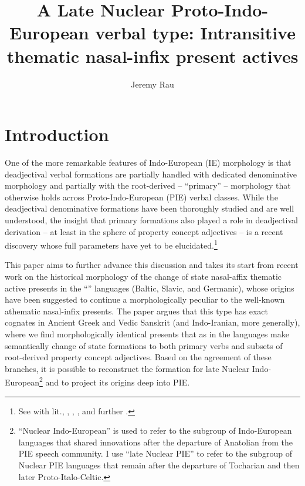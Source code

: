 \documentclass[output=paper,colorlinks,citecolor=brown]{langscibook}
\author{Jeremy Rau\orcid{}\affiliation{Harvard University}}
\title{A Late Nuclear Proto-Indo-European verbal type: Intransitive thematic nasal-infix present actives}
\begin{document}
\maketitle

\section{Introduction} 

 


One of the more remarkable features of Indo-European (IE) morphology is that deadjectival verbal formations are partially handled with dedicated denominative morphology and partially with the root-derived -- ``primary'' -- morphology that otherwise holds across Proto-Indo-European (PIE) verbal classes. While the deadjectival denominative formations have been thoroughly studied and are well understood, the insight that primary formations also played a role in deadjectival derivation  -- at least in the sphere of property concept adjectives -- is a recent discovery whose full parameters have yet to be elucidated.\footnote{See \citealt{Rau2009} with lit., \citeyear{Rau2013}, \citeyear{Rau2016}, \citeyear{Rau2017}, and further \citealt{Nussbaum2022}.}  

This paper aims to further advance this discussion and takes its start from recent work on the historical morphology of the  change of state nasal-affix thematic active presents  in the “” languages (Baltic, Slavic, and Germanic), whose origins have been suggested to continue a morphologically peculiar  to the well-known athematic nasal-infix  presents. The paper argues that this type has exact cognates in Ancient Greek and Vedic Sanskrit (and Indo-Iranian, more generally), where we find morphologically identical presents that as in the  languages make semantically  change of state formations to both primary verbs and subsets of root-derived property concept adjectives. Based on the agreement of these branches, it is possible to reconstruct the formation for late Nuclear Indo-European\footnote{“Nuclear Indo-European” is used to refer to the subgroup of Indo-European languages that shared innovations after the departure of Anatolian from the PIE speech community. I use “late Nuclear PIE” to refer to the subgroup of Nuclear PIE languages that remain after the departure of Tocharian and then later Proto-Italo-Celtic.} and to project its origins deep into PIE.
\end{document}
